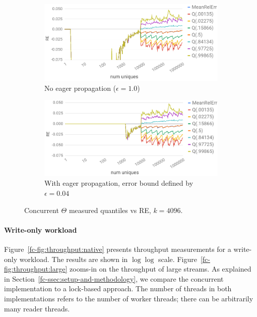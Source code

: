 \begin{figure}[tb]
    \setlength{\abovecaptionskip}{0pt}
    \setlength{\belowcaptionskip}{0pt}
    \setlength\textfloatsep{0pt}
    \centering
    \begin{subfigure}{\columnwidth}\centering
    \includegraphics[width=\textwidth]{graphics/fast-concurrent/theta-accuracy.PNG}
    \caption{No eager propagation ($\epsilon=1.0$)}
    \label{fc-fig:accuracy}
    \end{subfigure}
    \begin{subfigure}{\columnwidth}\centering
    \includegraphics[width=\textwidth]{graphics/fast-concurrent/theta-accuracy-adaptive.PNG}
    \caption{With eager propagation, error bound defined by $\epsilon=0.04$}
    \label{fc-fig:accuracy-adaptive}
    \end{subfigure}
      \caption{Concurrent $\Theta$ measured quantiles vs RE, $k = 4096$.}
      \label{fc-fig:accuracy-res}
\end{figure}

\paragraph{Write-only workload}
Figure~\ref{fc-fig:throughput:native} presents throughput measurements for a write-only workload. The results are shown in $\log \log$ scale.
Figure~\ref{fc-fig:throughput:large} zooms-in on the throughput of large streams. As explained in Section~\ref{fc-ssec:setup-and-methodology},
we compare the concurrent implementation to a lock-based approach. The number of threads in both implementations refers to the
number of worker threads; there can be arbitrarily many reader threads.

